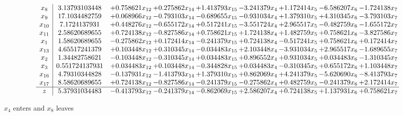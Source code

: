 \documentclass[10pt]{article}
\begin{document}
 \[\begin{array}{c| c c@{\hskip 2pt} c@{\hskip 2pt} c@{\hskip 2pt} c@{\hskip 2pt} c@{\hskip 2pt} c@{\hskip 2pt} c@{\hskip 2pt} }
 x_{8}   &  3.13793103448 & + 0.758621 x_{12} & + 0.275862 x_{14} & + 1.413793 x_{15} & -3.241379 x_{4} & + 1.172414 x_{5} & -6.586207 x_{6} & -1.724138 x_{7}\\
 x_{9}   &  17.1034482759 & + 0.068966 x_{12} & -0.793103 x_{14} & -0.689655 x_{15} & -0.931034 x_{4} & + 1.379310 x_{5} & + 4.310345 x_{6} & -3.793103 x_{7}\\
 x_{10}   &  7.1724137931 & + 0.448276 x_{12} & -0.655172 x_{14} & + 0.517241 x_{15} & -3.551724 x_{4} & + 2.965517 x_{5} & -0.482759 x_{6} & -1.655172 x_{7}\\
 x_{11}   &  2.58620689655 & + 0.724138 x_{12} & -0.827586 x_{14} & + 0.758621 x_{15} & + 1.724138 x_{4} & + 1.482759 x_{5} & + 0.758621 x_{6} & -3.827586 x_{7}\\
 x_{1}   &  1.58620689655 & -0.275862 x_{12} & + 0.172414 x_{14} & -0.241379 x_{15} & + 0.724138 x_{4} & -0.517241 x_{5} & + 0.758621 x_{6} & + 0.172414 x_{7}\\
 x_{13}   &  4.65517241379 & + 0.103448 x_{12} & + 0.310345 x_{14} & -0.034483 x_{15} & + 2.103448 x_{4} & -3.931034 x_{5} & + 2.965517 x_{6} & -1.689655 x_{7}\\
 x_{2}   &  1.34482758621 & -0.103448 x_{12} & -0.310345 x_{14} & + 0.034483 x_{15} & + 0.896552 x_{4} & + 0.931034 x_{5} & + 0.034483 x_{6} & -1.310345 x_{7}\\
 x_{3}   &  0.551724137931 & + 0.034483 x_{12} & + 0.103448 x_{14} & -0.344828 x_{15} & + 0.034483 x_{4} & -0.310345 x_{5} & + 0.655172 x_{6} & + 1.103448 x_{7}\\
 x_{16}   &  4.79310344828 & -0.137931 x_{12} & -1.413793 x_{14} & + 1.379310 x_{15} & + 0.862069 x_{4} & + 4.241379 x_{5} & -5.620690 x_{6} & -8.413793 x_{7}\\
 x_{17}   &  8.58620689655 & + 0.724138 x_{12} & -0.827586 x_{14} & -0.241379 x_{15} & -0.275862 x_{4} & + 0.482759 x_{5} & -0.241379 x_{6} & + 2.172414 x_{7}\\
\hline
z    &  5.37931034483 & -0.413793 x_{12} & -0.241379 x_{14} & -0.862069 x_{15} & + 2.586207 x_{4} & + 0.724138 x_{5} & + 1.137931 x_{6} & + 0.758621 x_{7}\\
\end{array}\]


 $ x_{4} $ enters and $ x_{8} $ leaves 
\end{document}
